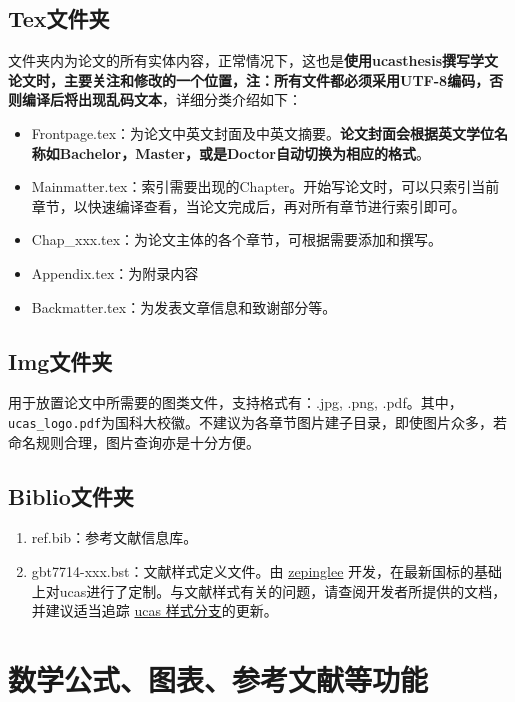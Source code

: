 \subsection{Tex文件夹}

文件夹内为论文的所有实体内容，正常情况下，这也是\textbf{使用ucasthesis撰写学文论文时，主要关注和修改的一个位置，注：所有文件都必须采用UTF-8编码，否则编译后将出现乱码文本}，详细分类介绍如下：

\begin{itemize}
    \item Frontpage.tex：为论文中英文封面及中英文摘要。\textbf{论文封面会根据英文学位名称如Bachelor，Master，或是Doctor自动切换为相应的格式}。
    \item Mainmatter.tex：索引需要出现的Chapter。开始写论文时，可以只索引当前章节，以快速编译查看，当论文完成后，再对所有章节进行索引即可。
    \item Chap{\_}xxx.tex：为论文主体的各个章节，可根据需要添加和撰写。
    \item Appendix.tex：为附录内容
    \item Backmatter.tex：为发表文章信息和致谢部分等。
\end{itemize}

\subsection{Img文件夹}

用于放置论文中所需要的图类文件，支持格式有：.jpg, .png, .pdf。其中，\verb|ucas_logo.pdf|为国科大校徽。不建议为各章节图片建子目录，即使图片众多，若命名规则合理，图片查询亦是十分方便。

\subsection{Biblio文件夹}

\begin{enumerate}
    \item ref.bib：参考文献信息库。
    \item gbt7714-xxx.bst：文献样式定义文件。由 \href{https://github.com/zepinglee}{zepinglee}  开发，在最新国标的基础上对ucas进行了定制。与文献样式有关的问题，请查阅开发者所提供的文档，并建议适当追踪 \href{https://github.com/CTeX-org/gbt7714-bibtex-style/tree/ucas}{ucas 样式分支}的更新。
\end{enumerate}

\section{数学公式、图表、参考文献等功能}

